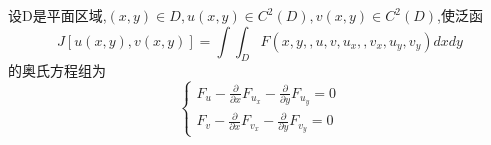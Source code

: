 \begin{corollary}
设D是平面区域,$(x,y) \in D ,u(x,y) \in C^2(D),v(x,y) \in C^2(D)$,使泛函
$$
J[u(x,y),v(x,y)]=\int\int_{D}F(x,y,,u,v,u_x,,v_x,u_y,v_y)dxdy
$$
的奥氏方程组为
$$
\left\{
  \begin{array}{ll}
   F_u -\frac{\partial}{\partial x}F_{u_x}-\frac{\partial}{\partial y}F_{u_y} = 0 \\
   F_v -\frac{\partial}{\partial x}F_{v_x}-\frac{\partial}{\partial y}F_{v_y} = 0
  \end{array}
\right.
$$
\end{corollary}
